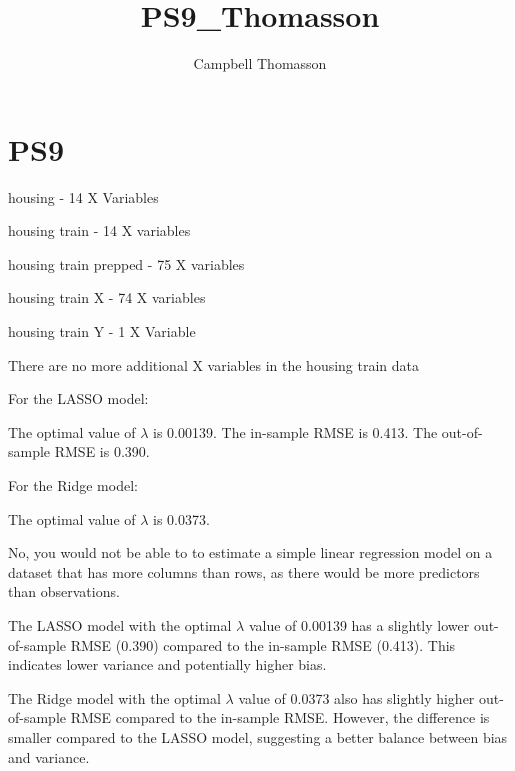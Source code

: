 \documentclass{article}
\title{PS9_Thomasson}
\author{Campbell Thomasson}
\begin{document}
\maketitle

\section{PS9}

housing - 14 X Variables

housing train - 14 X variables

housing train prepped - 75 X variables

housing train X - 74 X variables 

housing train Y - 1 X Variable

There are no more additional X variables in the housing train data

For the LASSO model:

The optimal value of $\lambda$ is 0.00139.
The in-sample RMSE is 0.413.
The out-of-sample RMSE is 0.390.

For the Ridge model:

The optimal value of $\lambda$ is 0.0373.

No, you would not be able to to estimate a simple linear regression model on a dataset that has more columns than rows, as there would be more predictors than observations.

The LASSO model with the optimal $\lambda$ value of 0.00139 has a slightly lower out-of-sample RMSE (0.390) compared to the in-sample RMSE (0.413). This indicates lower variance and potentially higher bias.

The Ridge model with the optimal $\lambda$ value of 0.0373 also has slightly higher out-of-sample RMSE compared to the in-sample RMSE. However, the difference is smaller compared to the LASSO model, suggesting a better balance between bias and variance.
\end{document}
